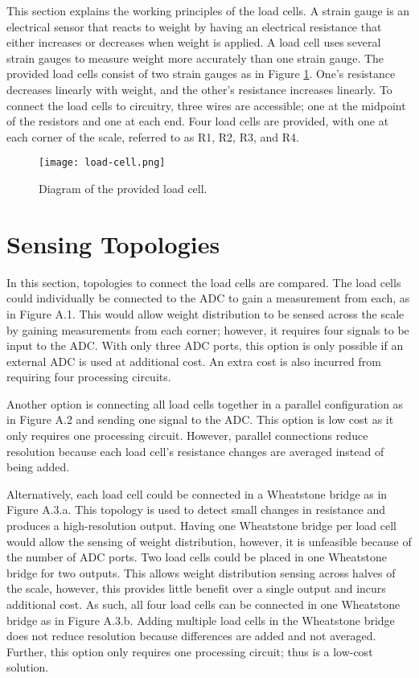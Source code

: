 This section explains the working principles of the load cells. A strain gauge is an electrical sensor that reacts to weight by having an electrical resistance that either increases or decreases when weight is applied. A load cell uses several strain gauges to measure weight more accurately than one strain gauge. The provided load cells consist of two strain gauges as in Figure \ref{fig:load_cell}. One’s resistance decreases linearly with weight, and the other’s resistance increases linearly. To connect the load cells to circuitry, three wires are accessible; one at the midpoint of the resistors and one at each end. Four load cells are provided, with one at each corner of the scale, referred to as R1, R2, R3, and R4.

\begin{figure}[!ht]
	\centering
	\texttt{[image: load-cell.png]}
	\caption{Diagram of the provided load cell.}
	\label{fig:load_cell}
\end{figure}

\section{Sensing Topologies}
In this section, topologies to connect the load cells are compared.
The load cells could individually be connected to the ADC to gain a measurement from each, as in Figure A.1. This would allow weight distribution to be sensed across the scale by gaining measurements from each corner; however, it requires four signals to be input to the ADC. With only three ADC ports, this option is only possible if an external ADC is used at additional cost. An extra cost is also incurred from requiring four processing circuits.

Another option is connecting all load cells together in a parallel configuration as in Figure A.2 and sending one signal to the ADC. This option is low cost as it only requires one processing circuit. However, parallel connections reduce resolution because each load cell's resistance changes are averaged instead of being added.

Alternatively, each load cell could be connected in a Wheatstone bridge as in Figure A.3.a. This topology is used to detect small changes in resistance and produces a high-resolution output. Having one Wheatstone bridge per load cell would allow the sensing of weight distribution, however, it is unfeasible because of the number of ADC ports. Two load cells could be placed in one Wheatstone bridge for two outputs. This allows weight distribution sensing across halves of the scale, however, this provides little benefit over a single output and incurs additional cost. As such, all four load cells can be connected in one Wheatstone bridge as in Figure A.3.b. Adding multiple load cells in the Wheatstone bridge does not reduce resolution because differences are added and not averaged. Further, this option only requires one processing circuit; thus is a low-cost solution. 


